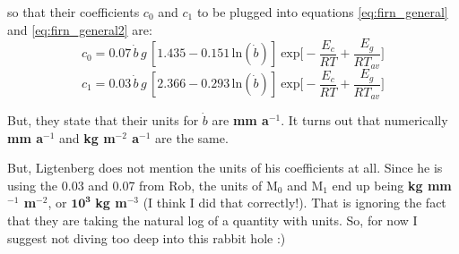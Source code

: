 \documentclass[12pt]{scrartcl}
\begin{document}
so that their coefficients $c_0$ and $c_1$ to be plugged into equations \ref{eq:firn_general} and \ref{eq:firn_general2} are: 
\begin{equation}
c_0 = 0.07\,\dot{b}\,g \, [1.435-0.151\, \textrm{ln}(\dot{b})]  \: \textrm{exp}\bigg[-\frac{E_c}{RT}+\frac{E_g}{RT_{av}}\bigg]
\end{equation}
\begin{equation}
c_1 = 0.03\,\dot{b}\,g \, [2.366-0.293\, \textrm{ln}(\dot{b})]  \: \textrm{exp}\bigg[-\frac{E_c}{RT}+\frac{E_g}{RT_{av}}\bigg]
\end{equation}




But, they state that their units for $\dot{b}$ are \textbf{mm a$^{-1}$}. It turns out that numerically \textbf{mm a$^{-1}$} and \textbf{kg m$^{-2}$ a$^{-1}$} are the same. 

But, Ligtenberg does not mention the units of his coefficients at all. Since he is using the 0.03 and 0.07 from Rob, the units of M$_{0}$ and M$_{1}$ end up being \textbf{kg mm$^{-1}$ m$^{-2}$}, or $\mathbf{10^{3}}$ \textbf{kg m$^{-3}$} (I think I did that correctly!). That is ignoring the fact that they are taking the natural log of a quantity with units. So, for now I suggest not diving too deep into this rabbit hole :)
\end{document}
